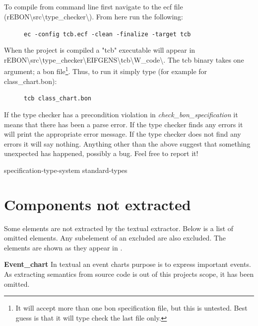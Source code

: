 \paragraph{}\noindent
To compile from command line first navigate to the ecf file (rEBON\textbackslash src\textbackslash type\_checker\textbackslash). From here run the following:
\begin{figure}[H]
\begin{center}{\texttt{ec -config tcb.ecf -clean -finalize -target tcb}}\end{center}
\end{figure}
When the project is compiled a "tcb" executable will appear in \newline rEBON\textbackslash src\textbackslash type\_checker\textbackslash EIFGENS\textbackslash tcb\textbackslash W\_code\textbackslash. The tcb binary takes one argument; a bon file\footnote{It will accept more than one bon specification file, but this is untested. Best guess is that it will type check the last file only.}. Thus, to run it simply type (for example for class\_chart.bon): 
\begin{figure}[H]
\begin{center}{\texttt{tcb class\_chart.bon}}\end{center}
\end{figure}
If the type checker has a precondition violation in \textit{check\_bon\_specification} it means that there has been a parse error. If the type checker finds any errors it will print the appropriate error message. If the type checker does not find any errors it will say nothing. Anything other than the above suggest that something unexpected has happened, possibly a bug. Feel free to report it!

{specification-type-system}
{standard-types}
\chapter{Components not extracted}
\label{components-not-extracted}
Some elements are not extracted by the textual \bon{} extractor. Below is a list of omitted elements. Any subelement of an excluded are also excluded. The elements are shown as they appear in \cite[pp. 352--359]{walden1995}.\newline\newline

\noindent\textbf{Event\_chart}\newline
In textual \bon{} an event charts purpose is to express important events. As extracting semantics from source code is out of this projects scope, it has been omitted.\newline\newline

